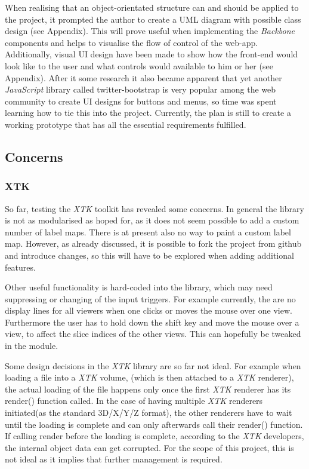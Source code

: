 \documentclass[a4paper,11pt,titlepage]{article}
\begin{document}
When realising that an object-orientated structure can and should be applied to the project, it prompted the author to create a UML diagram with possible class design (see Appendix). This will prove useful when implementing the \textit{Backbone} components and helps to visualise the flow of control of the web-app. Additionally, visual UI design have been made to show how the front-end would look like to the user and what controls would available to him or her (see Appendix). After it some research it also became apparent that yet another \textit{JavaScript} library called twitter-bootstrap is very popular among the web community to create UI designs for buttons and menus, so time was spent learning how to tie this into the project.
Currently, the plan is still to create a working prototype that has all the essential requirements fulfilled.


\subsection{Concerns}

\subsubsection{XTK}

So far, testing the \textit{XTK} toolkit has revealed some concerns. In general the library is not as modularised as hoped for, as it does not seem possible to add a custom number of label maps. There is at present also no way to paint a custom label map. However, as already discussed, it is possible to fork the project from github and introduce changes, so this will have to be explored when adding additional features.

Other useful functionality is hard-coded into the library, which may need suppressing or changing of the input triggers. For example currently, the are no display lines for all viewers when one clicks or moves the mouse over one view. Furthermore the user has to hold down the shift key and move the mouse over a view, to affect the slice indices of the other views. This can hopefully be tweaked in the module.

Some design decisions in the \textit{XTK} library are so far not ideal. For example when loading a file into a \textit{XTK} volume, (which is then attached to a \textit{XTK} renderer), the actual loading of the file happens only once the first \textit{XTK} renderer has its render() function called. In the case of having multiple \textit{XTK} renderers initiated(as the standard 3D/X/Y/Z format), the other renderers have to wait until the loading is complete and can only afterwards call their render() function. If calling render before the loading is complete, according to the \textit{XTK} developers, the internal object data can get corrupted. For the scope of this project, this is not ideal as it implies that further management is required.
\end{document}
